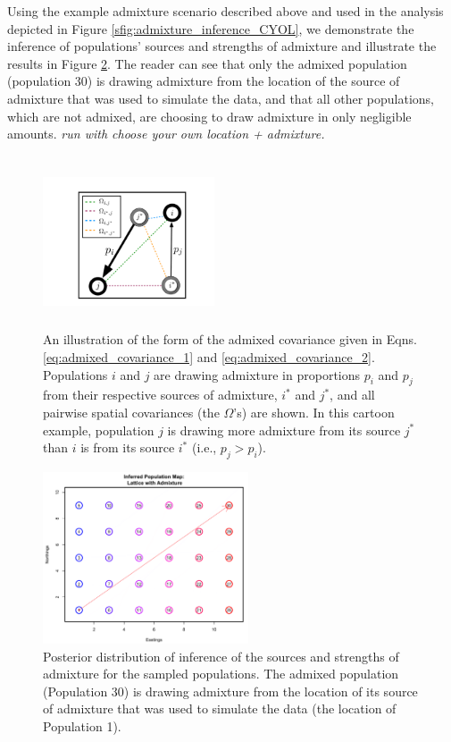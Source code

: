 \documentclass[12pt]{article}
\newcommand{\identifyadmixsource}[1]{{#1^{*}}}
\newcommand{\gc}[1]{{\em \color{blue} #1}}
\begin{document}
Using the example admixture scenario described above and used in the analysis depicted in Figure \ref{sfig:admixture_inference_CYOL}, we demonstrate the inference of populations' sources and strengths of admixture and illustrate the results in Figure \ref{sfig:corner_admixture_just_adinf}.  The reader can see that only the admixed population (population 30) is drawing admixture from the location of the source of admixture that was used to simulate the data, and that all other populations, which are not admixed, are choosing to draw admixture in only negligible amounts. \gc{run with choose your own location + admixture.}

\begin{figure}[ht!]
	\centering
	\includegraphics[width=2in,height=2in]{figs/admix_cov_fig.pdf}
	\caption{An illustration of the form of the admixed covariance given in Eqns. \eqref{eq:admixed_covariance_1} and \eqref{eq:admixed_covariance_2}.  Populations $i$ and $j$ are drawing admixture in proportions $p_i$ and $p_j$ from their respective sources of admixture, $\identifyadmixsource{i}$ and $\identifyadmixsource{j}$, and all pairwise spatial covariances (the $\Omega$'s) are shown.  In this cartoon example, population $j$ is drawing more admixture from its source $\identifyadmixsource{j}$ than $i$ is from its source $\identifyadmixsource{i}$ (i.e., $p_j > p_i$).}\label{sfig:admixed_cov_diagram}
\end{figure}

\begin{figure}[ht!]
	\centering
	\includegraphics[width=2.4in,height=2in]{figs/sims/GeoGenMap_corner_admixture_adinf.png}
	\caption{Posterior distribution of inference of the sources and strengths of admixture for the sampled populations.  The admixed population (Population 30) is drawing admixture from the location of its source of admixture that was used to simulate the data (the location of Population 1).}\label{sfig:corner_admixture_just_adinf}
\end{figure}
\end{document}
